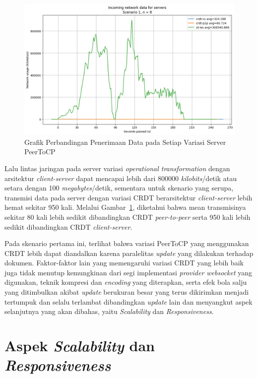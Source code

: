\begin{figure}
 \centering
 \includegraphics[width=15cm]{./assets/skripsi/benchmark-vis_cell_2_output_24}
 \caption{Grafik Perbandingan Penerimaan Data pada Setiap Variasi Server PeerToCP}
 \label{fig:2-24}
\end{figure}

Lalu lintas jaringan pada server variasi \textit{operational transformation} dengan arsitektur \textit{client-server} dapat mencapai lebih dari 800000 \textit{kilobits}/detik atau setara dengan 100 \textit{megabytes}/detik, sementara untuk skenario yang serupa, transmisi data pada server dengan variasi CRDT berarsitektur \textit{client-server} lebih hemat sekitar 950 kali. Melalui Gambar~\ref{fig:2-24}, diketahui bahwa mean transmisinya sekitar 80 kali lebih sedikit dibandingkan CRDT \textit{peer-to-peer} serta 950 kali lebih sedikit dibandingkan CRDT \textit{client-server}.

Pada skenario pertama ini, terlihat bahwa variasi PeerToCP yang menggunakan CRDT lebih dapat diandalkan karena paralelitas \textit{update} yang dilakukan terhadap dokumen. Faktor-faktor lain yang memengaruhi variasi CRDT yang lebih baik juga tidak menutup kemungkinan dari segi implementasi \textit{provider websocket} yang digunakan, teknik kompresi dan \textit{encoding} yang diterapkan, serta efek bola salju yang ditimbulkan akibat \textit{update} berukuran besar yang terus dikirimkan menjadi tertumpuk dan selalu terlambat dibandingkan \textit{update} lain dan menyangkut aspek selanjutnya yang akan dibahas, yaitu \textit{Scalability} dan \textit{Responsiveness}.

\section{Aspek \textit{Scalability} dan \textit{Responsiveness}}


